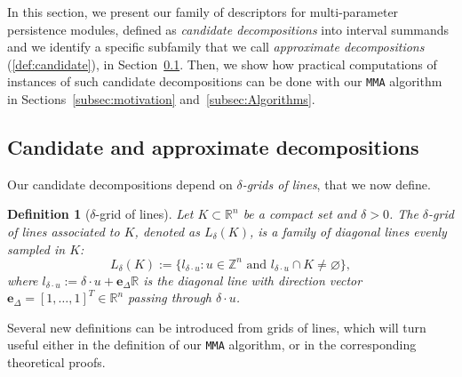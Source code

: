 \documentclass{article}
\newcommand{\R}{\mathbb{R}}
\newcommand{\Z}{\mathbb{Z}}
\newcommand{\MMA}{\texttt{MMA}}
\newcommand{\mmaout}{candidate}
\newcommand{\mmaoutcompat}{approximate}
\newtheorem{definition}{Definition}%
\newcommand{\rebuttal}[1]{{ #1}}
\begin{document}
In this section,  we present our 
family of \rebuttal{descriptors} for multi-parameter persistence modules,
defined as {\em \mmaout{} decompositions} into interval summands 
\rebuttal{and we identify a specific subfamily that we call {\em \mmaoutcompat{} decompositions} (\cref{def:candidate}), in Section~\ref{subsec:approx}.}
Then, we show how practical computations of instances of such \mmaout{} decompositions can be done with our \MMA{} algorithm in Sections~\ref{subsec:motivation} and~\ref{subsec:Algorithms}.


\subsection{Candidate and \mmaoutcompat{} decompositions} \label{subsec:approx}
Our candidate decompositions depend on
{\em $\delta$-grids of lines}, that we now define. \\

\begin{definition}[$\delta$-grid of lines]\label{def:grid}
	Let $K\subset\R^n$ be a compact set and $\delta > 0$. 
	The $\delta$-grid of lines associated to $K$, denoted as $L_\delta(K)$, is a family of diagonal lines evenly sampled in $K$:
	$$L_\delta(K):=\{l_{\delta\cdot u}: u \in \Z^n \text{ and } l_{\delta\cdot
	u}\cap K \neq \varnothing\},$$
	where $l_{\delta\cdot u}:=\delta \cdot
	u+\boldsymbol{e}_\Delta\rebuttal{\mathbb R}$ is the diagonal line with
	direction vector $\boldsymbol{e}_\Delta=[1,\dots,1]^T\in\R^n$ passing through
	$\delta\cdot u$. \\
\end{definition}















Several new definitions can be introduced from grids of lines, which will turn useful either in the definition of our \MMA{} algorithm, or in the corresponding theoretical proofs. \\
\end{document}
